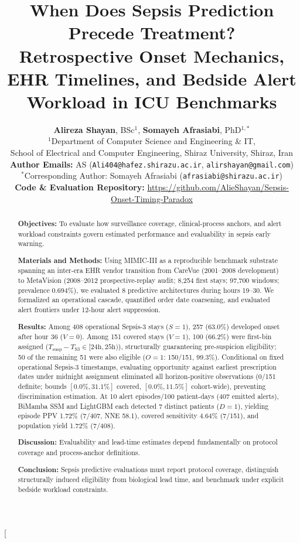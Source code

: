 \documentclass[10pt,twocolumn,a4paper]{article}
\title{\vspace{-1.2em}\textbf{\Large When Does Sepsis Prediction Precede Treatment?\\ Retrospective Onset Mechanics, EHR Timelines, and Bedside Alert Workload in ICU Benchmarks}}
\author{
    \textbf{Alireza Shayan}, BSc$^{1}$, \quad \textbf{Somayeh Afrasiabi}, PhD$^{1,*}$ \\[0.35em]
    $^{1}$Department of Computer Science and Engineering \& IT,\\
    School of Electrical and Computer Engineering, Shiraz University, Shiraz, Iran \\[0.25em]
    \textbf{Author Emails:} AS (\texttt{Ali404@hafez.shirazu.ac.ir}, \texttt{alirshayan@gmail.com}) \\
    $^{*}$Corresponding Author: Somayeh Afrasiabi (\texttt{afrasiabi@shirazu.ac.ir}) \\[0.2em]
    {\small \textbf{Code \& Evaluation Repository:} \url{https://github.com/AlieShayan/Sepsis-Onset-Timing-Paradox}}
}
\date{}
\begin{document}
\twocolumn[{%
\begin{@twocolumnfalse}
\maketitle

\begin{abstract}
\noindent\textbf{Objectives:} To evaluate how surveillance coverage, clinical-process anchors, and alert workload constraints govern estimated performance and evaluability in sepsis early warning.

\vspace{0.25em}
\noindent\textbf{Materials and Methods:} Using MIMIC-III as a reproducible benchmark substrate spanning an inter-era EHR vendor transition from CareVue (2001--2008 development) to MetaVision (2008--2012 prospective-replay audit; 8,254 first stays; 97,700 windows; prevalence 0.694\%), we evaluated 8 predictive architectures during hours 19--30. We formalized an operational cascade, quantified order date coarsening, and evaluated alert frontiers under 12-hour alert suppression.

\vspace{0.25em}
\noindent\textbf{Results:} Among 408 operational Sepsis-3 stays ($S=1$), 257 (63.0\%) developed onset after hour 36 ($V=0$). Among 151 covered stays ($V=1$), 100 (66.2\%) were first-bin assigned ($T_{\mathrm{susp}} - T_{\mathrm{S3}} \in [24\mathrm{h}, 25\mathrm{h})$), structurally guaranteeing pre-suspicion eligibility; 50 of the remaining 51 were also eligible ($O=1$: 150/151, 99.3\%). Conditional on fixed operational Sepsis-3 timestamps, evaluating opportunity against earliest prescription dates under midnight assignment eliminated all horizon-positive observations (0/151 definite; bounds $[0.0\%, 31.1\%]$ covered, $[0.0\%, 11.5\%]$ cohort-wide), preventing discrimination estimation. At 10 alert episodes/100 patient-days (407 emitted alerts), BiMamba SSM and LightGBM each detected 7 distinct patients ($D=1$), yielding episode PPV 1.72\% (7/407, NNE 58.1), covered sensitivity 4.64\% (7/151), and population yield 1.72\% (7/408).

\vspace{0.25em}
\noindent\textbf{Discussion:} Evaluability and lead-time estimates depend fundamentally on protocol coverage and process-anchor definitions.

\vspace{0.25em}
\noindent\textbf{Conclusion:} Sepsis predictive evaluations must report protocol coverage, distinguish structurally induced eligibility from biological lead time, and benchmark under explicit bedside workload constraints.


\end{abstract}
\end{@twocolumnfalse}}
\end{document}
